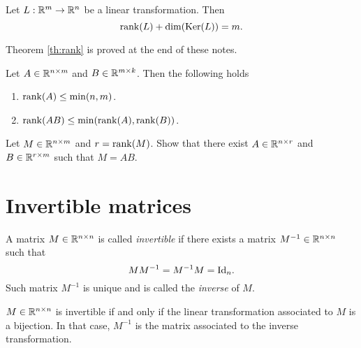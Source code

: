 \documentclass[11pt,nocut]{article}
\begin{document}
\begin{theorem}\label{th:rank}
	Let $L: \mathbb{R}^m \to \mathbb{R}^n$ be a linear transformation. Then
	$$
	{{\rm rank}}(L) + {{\rm dim}}({{\rm Ker}}(L)) = m.
	$$
\end{theorem}
Theorem \ref{th:rank} is proved at the end of these notes.

\begin{proposition}
	Let $A \in \mathbb{R}^{n \times m}$ and $B \in \mathbb{R}^{m \times k}$. Then the following holds
	\begin{enumerate}[label=(\roman*)]
		\item ${{\rm rank}}(A) \leq \min(n,m)$.
		\item ${{\rm rank}}(AB) \leq \min({{\rm rank}}(A),{{\rm rank}}(B))$.
	\end{enumerate}
\end{proposition}

\begin{exercise}[Important]
	Let $M \in \mathbb{R}^{n \times m}$ and $r = {{\rm rank}}(M)$. Show that there exist $A \in \mathbb{R}^{n \times r}$ and $B \in \mathbb{R}^{r \times m}$ such that $M = AB$.
\end{exercise}

\section{Invertible matrices}

\begin{definition}\label{prop:matrix_inverse}
	A matrix $M \in \mathbb{R}^{n \times n}$ is called \emph{invertible} if there exists a matrix $M^{-1} \in \mathbb{R}^{n \times n}$ such that 
	$$
	M M^{-1} = M^{-1} M = {{\rm Id}}_n.
	$$
	Such matrix $M^{-1}$ is unique and is called the \emph{inverse} of $M$.
\end{definition}

\begin{remark}
	$M \in \mathbb{R}^{n \times n}$ is invertible if and only if the linear transformation associated to $M$ is a bijection. In that case, $M^{-1}$ is the matrix associated to the inverse transformation.
\end{remark}
\end{document}
